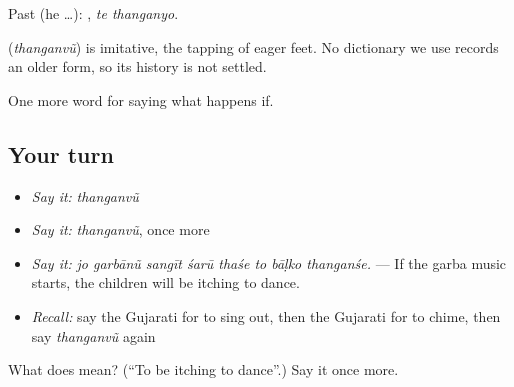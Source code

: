 Past (he …):  , \emph{te thanganyo}.

\begin{cousinweb}
\textbf{} (\emph{thanganvũ}) is imitative, the tapping of eager feet. No dictionary we use records an older form, so its history is not settled.
\end{cousinweb}

\begin{grammarlens}[title={What you've built}]
One more word for saying what happens if.
\end{grammarlens}

\subsection*{Your turn}
\begin{itemize}
\raggedright
  \item \emph{Say it:} \emph{thanganvũ}
  \item \emph{Say it:} \emph{thanganvũ}, once more
  \item \emph{Say it:} \emph{jo garbānũ sangīt śarū thaśe to bāḷko thanganśe.} — If the garba music starts, the children will be itching to dance.
  \item \emph{Recall:} say the Gujarati for to sing out, then the Gujarati for to chime, then say \emph{thanganvũ} again
\end{itemize}

\begin{tcolorbox}[breakable,colback=teal!4,colframe=teal!35!black,title={Before you move on}]
What does  mean? (\textquotedblleft{}To be itching to dance\textquotedblright{}.) Say it once more.
\end{tcolorbox}
